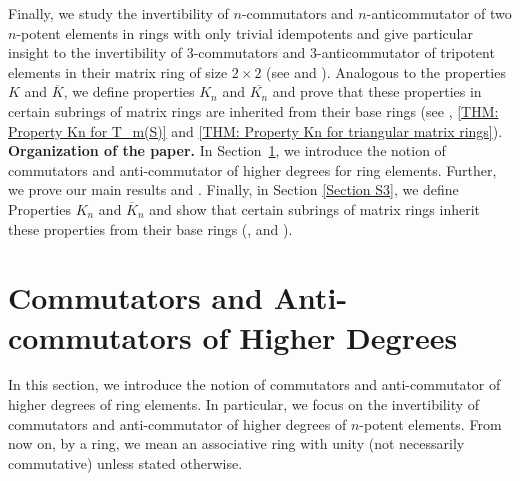\documentclass[12pt]{amsart}
\theoremstyle{definition}
\numberwithin{equation}{section}
\begin{document}
Finally, we study the invertibility of $n$-commutators and $n$-anticommutator of two $n$-potent elements in rings with only trivial idempotents and give particular insight to the invertibility of $3$-commutators and $3$-anticommutator of tripotent elements in their matrix ring of size $2\times 2$ (see  and ). Analogous to the properties $K$ and $\overline{K}$, we define properties $K_n$ and $\overline{K_n}$ and prove that these properties in certain subrings of matrix rings are inherited from their base rings (see , \ref{THM: Property Kn for T_m(S)}  and \ref{THM: Property Kn for triangular matrix rings}). \\

\textbf{Organization of the paper.} In
Section~\ref{Section S2}, we introduce the notion of commutators and anti-commutator of higher degrees for ring elements. Further, we  prove our main results  and . Finally, in Section \ref{Section S3}, we define Properties $K_n$ and $\overline{K}_n$ and show that certain subrings of matrix rings inherit these properties from their base rings (,   and ). 

\section{Commutators and Anti-commutators of Higher Degrees}\label{Section S2}
 In this section, we introduce the notion of commutators and anti-commutator of higher degrees of ring elements. In particular, we focus on the invertibility of commutators and anti-commutator of higher degrees of $n$-potent elements. From now on, by a ring, we mean an associative ring with unity (not necessarily commutative) unless stated otherwise.
 
\end{document}

